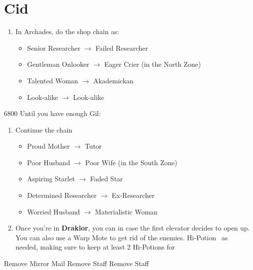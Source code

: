 \chapter{Cid}

\begin{enumerate}
\item In Archades, do the shop chain as:
\begin{itemize}
	\item Senior Researcher $\rightarrow$ Failed Researcher
	\item Gentleman Onlooker $\rightarrow$ Eager Crier (in the North Zone)
	\item Talented Woman $\rightarrow$ Akademickan
	\item Look-alike $\rightarrow$ Look-alike
\end{itemize}
\end{enumerate}
\begin{shop}{6800}
Until you have enough Gil:
\end{shop}
\begin{enumerate}[resume]
\item Continue the chain
\begin{itemize}
\item Proud Mother $\rightarrow$ Tutor
\item Poor Husband $\rightarrow$ Poor Wife (in the South Zone)
\item Aspiring Starlet $\rightarrow$ Faded Star
\item Determined Researcher $\rightarrow$ Ex-Researcher
\item Worried Husband $\rightarrow$ Materialistic Woman
\end{itemize}
\item Once you're in \textbf{Draklor}, you can \decoy{\ashe}{\ashe} in case the first elevator decides to open up. You can also use a Warp Mote to get rid of the enemies.
\penelof Hi-Potion \vaan\ as needed, making sure to keep at least 2 Hi-Potions for 
\end{enumerate}
\begin{menu}
\begin{itemize}
\battlefast
\end{itemize}
\end{menu}
\begin{equip}
\begin{itemize}
\vaanf Remove Mirror Mail
\ashef Remove Staff
\penelof Remove Staff
\end{itemize}
\end{equip}
